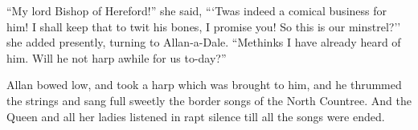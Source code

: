 ``My lord Bishop of Hereford!'' she said, ```Twas indeed a comical
business for him! I shall keep that to twit his bones, I promise you! So
this is our minstrel?'' she added presently, turning to Allan-a-Dale.
``Methinks I have already heard of him. Will he not harp awhile for us
to-day?''

Allan bowed low, and took a harp which was brought to him, and he
thrummed the strings and sang full sweetly the border songs of the North
Countree. And the Queen and all her ladies listened in rapt silence till
all the songs were ended.
